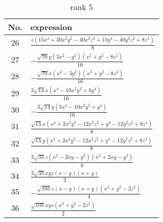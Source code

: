 \documentclass[fleqn,8pt,landscape]{jsarticle}
\begin{document}
\begin{table}[ht!]
\begin{center}
\caption{rank 5}
\renewcommand{\arraystretch}{1.3}
\begin{tabular}{cl} \hline \hline
No. & expression \\ \hline
$ 26 $ & $ \frac{z \left(15 x^{4} + 30 x^{2} y^{2} - 40 x^{2} z^{2} + 15 y^{4} - 40 y^{2} z^{2} + 8 z^{4}\right)}{8} $ \\
$ 27 $ & $ - \frac{\sqrt{70} y \left(3 x^{2} - y^{2}\right) \left(x^{2} + y^{2} - 8 z^{2}\right)}{16} $ \\
$ 28 $ & $ - \frac{\sqrt{70} x \left(x^{2} - 3 y^{2}\right) \left(x^{2} + y^{2} - 8 z^{2}\right)}{16} $ \\
$ 29 $ & $ \frac{3 \sqrt{14} x \left(x^{4} - 10 x^{2} y^{2} + 5 y^{4}\right)}{16} $ \\
$ 30 $ & $ - \frac{3 \sqrt{14} y \left(5 x^{4} - 10 x^{2} y^{2} + y^{4}\right)}{16} $ \\
$ 31 $ & $ \frac{\sqrt{15} x \left(x^{4} + 2 x^{2} y^{2} - 12 x^{2} z^{2} + y^{4} - 12 y^{2} z^{2} + 8 z^{4}\right)}{8} $ \\
$ 32 $ & $ \frac{\sqrt{15} y \left(x^{4} + 2 x^{2} y^{2} - 12 x^{2} z^{2} + y^{4} - 12 y^{2} z^{2} + 8 z^{4}\right)}{8} $ \\
$ 33 $ & $ \frac{3 \sqrt{35} z \left(x^{2} - 2 x y - y^{2}\right) \left(x^{2} + 2 x y - y^{2}\right)}{8} $ \\
$ 34 $ & $ \frac{3 \sqrt{35} x y z \left(x - y\right) \left(x + y\right)}{2} $ \\
$ 35 $ & $ - \frac{\sqrt{105} z \left(x - y\right) \left(x + y\right) \left(x^{2} + y^{2} - 2 z^{2}\right)}{4} $ \\
$ 36 $ & $ \frac{\sqrt{105} x y z \left(x^{2} + y^{2} - 2 z^{2}\right)}{2} $ \\
 \hline \hline
\end{tabular}
\end{center}
\end{table}
\end{document}

